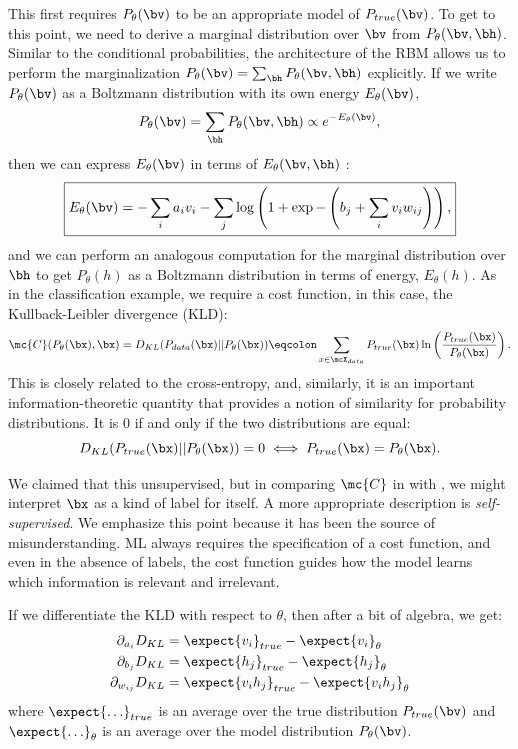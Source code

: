 This first requires $P_\theta(\bv)$ to be an appropriate model of
$P_{true}(\bv)$. To get to this point, we need to derive a marginal
distribution over $\bv$ from $P_\theta(\bv,\bh)$. Similar to the
conditional probabilities, the architecture of the RBM allows us to
perform the marginalization
$P_\theta(\bv)=\sum_{\bh}P_\theta(\bv,\bh)$ explicitly. If we write
$P_\theta(\bv)$ as a Boltzmann distribution with its own energy
$E_\theta(\bv)$,
\begin{equation}%
  P_\theta(\bv)=\sum_{\bh} P_\theta(\bv,\bh) \propto e^{-E_\theta(\bv)},
\end{equation}%
then we can express $E_\theta(\bv)$ in terms of $E_\theta(\bv,\bh)$
:
\begin{equation}
  \boxed{
    E_\theta(\bv)=-\sum_i a_i v_i -\sum_j \log\left(1 + \exp{-\left(b_j + \sum_{i} v_i w_{ij}\right)}\right),
    \label{eq:rbm-marginal-energy-v}
  }
\end{equation}
and we can perform an analogous computation for the marginal
distribution over $\bh$ to get $P_\theta(h)$ as a Boltzmann
distribution in terms of energy, $E_\theta(h)$. As in the
classification example, we require a cost function, in this case, the
Kullback-Leibler divergence (KLD):%
\begin{equation}
  \mc{C}(P_\theta(\bx),\bx)=D_{KL}(P_{data}(\bx)||P_{\theta}(\bx))\eqcolon\sum_{x\in\mcX_{data}} P_{true}(\bx)\ln\left(\frac{P_{true}(\bx)}{P_{\theta}(\bx)}\right). \label{eq:kld}
\end{equation}
This is closely related to the cross-entropy, and, similarly, it is an
important information-theoretic quantity  that provides
a notion of similarity for probability distributions. It is $0$ if and
only if the two distributions are equal:
\begin{equation}%
  D_{KL}(P_{true}(\bx)||P_{\theta}(\bx))=0\iff P_{true}(\bx)=P_{\theta}(\bx).
\end{equation}%

We claimed that this unsupervised, but in comparing $\mc{C}$ in 
with , we might interpret $\bx$ as a kind of
label for itself. A more appropriate description is
\textit{self-supervised}. We emphasize this point because it has been
the source of misunderstanding. ML always requires the specification
of a cost function, and even in the absence of labels, the cost function
guides how the model learns which information is relevant and irrelevant.

If we differentiate the KLD with respect to $\theta$, then after a bit
of algebra, we get:%
\begin{align}%
  \partial_{a_i} D_{KL}&=\expect{v_i}_{true}-\expect{v_i}_\theta\\
  \partial_{b_j} D_{KL}&=\expect{h_j}_{true}-\expect{h_j}_\theta\\
  \partial_{w_{ij}} D_{KL}&=\expect{v_i h_j}_{true}-\expect{v_i h_j}_\theta
\end{align}%
where $\expect{\ldots}_{true}$ is an average over the true
distribution $P_{true}(\bv)$ and $\expect{\ldots}_{\theta}$ is an
average over the model distribution $P_{\theta}(\bv)$.

